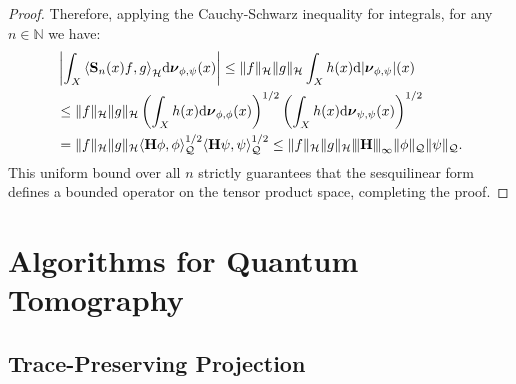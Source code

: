 \documentclass[noinfoline]{imsart}\setcounter{tocdepth}{2}
\renewcommand{\b}[1]{\mathbb{#1}} %
\newcommand{\m}[1]{\mathbf{#1}} %
\renewcommand{\c}[1]{\mathcal{#1}} %
\newcommand{\mb}[1]{\boldsymbol{#1}} %
\newcommand{\rd}{\mathrm{d}} %
\newcommand{\vertiii}[1]{{\left\vert\kern-0.25ex\left\vert\kern-0.25ex\left\vert #1 
    \right\vert\kern-0.25ex\right\vert\kern-0.25ex\right\vert}} %
\newcommand{\innpr}[2]{{\left\langle {#1},{#2}\right\rangle}} %
\theoremstyle{plain}
\begin{document}
\begin{appendix}
\begin{proof}
Therefore, applying the Cauchy-Schwarz inequality for integrals, for any $n \in \b{N}$ we have:
\begin{align*}
    &\left| \int_{X} \innpr{\m{S}_{n}(x) f}{g}_{\c{H}} \rd \mb{\nu}_{\phi, \psi} (x) \right| 
    \le \|f\|_{\c{H}} \|g\|_{\c{H}} \int_{X} h(x) \rd |\mb{\nu}_{\phi, \psi}| (x) \\ 
    &\le \|f\|_{\c{H}} \|g\|_{\c{H}} \left( \int_{X} h(x) \rd \mb{\nu}_{\phi, \phi} (x) \right)^{1/2} \left( \int_{X} h(x) \rd \mb{\nu}_{\psi, \psi} (x) \right)^{1/2} \\
    &= \|f\|_{\c{H}} \|g\|_{\c{H}} \innpr{\m{H} \phi}{\phi}_{\c{Q}}^{1/2} \innpr{\m{H} \psi}{\psi}_{\c{Q}}^{1/2} \le \|f\|_{\c{H}} \|g\|_{\c{H}} \vertiii{\m{H}}_{\infty} \|\phi\|_{\c{Q}} \|\psi\|_{\c{Q}}.
\end{align*}
This uniform bound over all $n$ strictly guarantees that the sesquilinear form defines a bounded operator on the tensor product space, completing the proof.
\end{proof}


\section{Algorithms for Quantum Tomography}

\subsection{Trace-Preserving Projection}\label{sec:tpp}



\end{appendix}
\end{document}
